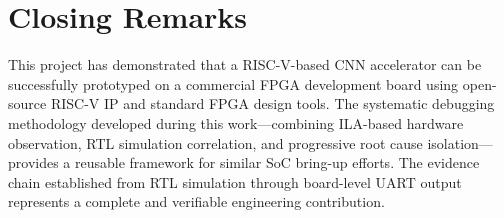 \section{Closing Remarks}\label{sec:6_4}

This project has demonstrated that a RISC-V-based CNN accelerator can be successfully prototyped on a commercial FPGA development board using open-source RISC-V IP and standard FPGA design tools. The systematic debugging methodology developed during this work---combining ILA-based hardware observation, RTL simulation correlation, and progressive root cause isolation---provides a reusable framework for similar SoC bring-up efforts. The evidence chain established from RTL simulation through board-level UART output represents a complete and verifiable engineering contribution.

